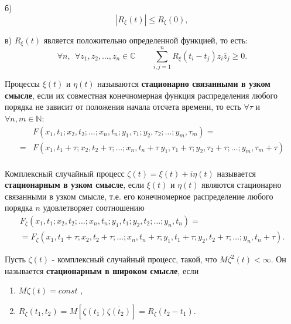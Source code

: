     б)  \begin{equation}
            \left|R_{\xi}(t)\right| \leq R_{\xi}(0) ,
            \label{14.7}
        \end{equation}
        
    в) $R_{\xi}(t)$ является положительно определенной функцией, то есть:
    \begin{equation}
    \forall n,\ \  \forall z_1, z_2, \ldots, z_n \in \mathbb{C} \qquad    \sum_{i, j=1}^n R_{\xi}\left(t_i-t_j\right) z_i \bar{z}_j \geq 0 .
        \label{14.8}
    \end{equation}

    \begin{definition}\label{smd_def_5} Процессы $\xi(t)$ и $\eta(t)$ называются \textbf{стационарно связанными в узком смысле}, если их совместная конечномерная функция распределения любого порядка не зависит от положения начала отсчета времени, то есть 
   \newline  $ \forall \tau$ и $ \forall n, m \in\mathbb{N} $:
    $$
    \begin{aligned}
    & F\left(x_1, t_1 ; x_2, t_2 ; \ldots ; x_n, t_n ; y_1, \tau_1 ; y_2, \tau_2 ; \ldots ; y_m, \tau_m\right)= \\
    = & F\left(x_1, t_1+\tau ; x_2, t_2+\tau ; \ldots ; x_n, t_n+\tau\  y_1, \tau_1+\tau ; y_2, \tau_2+\tau ; \ldots ; y_m, \tau_m+\tau\right) \\
    \end{aligned}
    $$
    \end{definition}
    
    \begin{definition}\label{smd_def_6} Комплексный случайный процесс 
     $ \zeta(t)=\xi(t)+i \eta(t) $
    называется \textbf{стационарным в узком смысле}, если $\xi(t)$ и $\eta(t)$ являются стационарно связанными в узком смысле, т.е. его конечномерное распределение любого порядка $n$ удовлетворяет соотношению
    $$
    \begin{gathered}
    F_\zeta\left(x_1, t_1 ; x_2, t_2 ; \ldots ; x_n, t_n ; y_1, t_1 ; y_2, t_2 ; \ldots ; y_n, t_n\right)= \\
    =F_\zeta\left(x_1, t_1+\tau ; x_2, t_2+\tau ; \ldots ; x_n, t_n+\tau ; y_1, t_1+\tau ; y_2, t_2+\tau ; \ldots ; y_n, t_n+\tau\right) .
    \end{gathered}
    $$
    \end{definition}
    
    \begin{definition}\label{smd_def_7} Пусть $\zeta(t)$ - комплексный случайный процесс, такой, что 
    \newline $M \zeta^2(t)<\infty$. Он называется \textbf{стационарным в широком смысле}, если
    \begin{enumerate}
        \item $ M \zeta(t) = const $ ,
        \item $ R_\zeta\left(t_1, t_2\right) = M\left[\zeta\left(t_1\right) \overline{\zeta\left(t_2\right)}\right]=R_\zeta\left(t_2-t_1\right) $.
    \end{enumerate}
	\end{definition}
    

